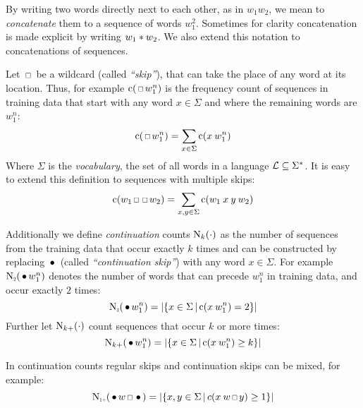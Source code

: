 By writing two words directly next to each other, as in $w_1 w_2$, we mean to
\emph{concatenate} them to a sequence of words $w_1^2$.
Sometimes for clarity concatenation is made explicit by writing
$w_1 * w_2$. We also extend this notation to concatenations of
sequences.

Let $\Skp$ be a wildcard (called \emph{``skip''}), that can take the place
of any word at its location.
Thus, for example $\Count(\Skp w_1^n)$ is the frequency count of sequences
in training data that start with any word $x \in \Sigma$ and where the remaining
words are $w_1^n$:
\begin{equation}
  \Count(\Skp w_1^n) = \sum_{x \in \Sigma} \Count(x \: w_1^n)
\end{equation}
Where $\Sigma$ is the \emph{vocabulary}, the set of all words in a language
$\mathcal{L} \subseteq \Sigma^{*}$.
It is easy to extend this definition to sequences with multiple skips:
\begin{equation}
  \Count(w_1 \Skp \Skp w_2) = \sum_{x, y \in \Sigma} \Count(w_1 \: x \: y \: w_2)
\end{equation}

Additionally we define \emph{continuation} counts $\operatorname{N}_k(\cdot)$ as
the number of sequences from the training data that occur exactly $k$ times and
can be constructed by replacing $\,\bullet\,$ (called \emph{``continuation skip''})
with any word $x \in \Sigma$.
For example $\ContCountII(\WSkp w_1^n)$ denotes the number of words that can
precede $w_1^n$ in training data, and occur exactly $2$ times:
\begin{equation}
  \ContCountII(\WSkp w_1^n) =
    \Cardinality{\left\{ x \in \Sigma \,\middle|\, \Count(x \: w_1^n) = 2 \right\}}
\end{equation}
Further let $\operatorname{N}_{k+}(\cdot)$ count sequences that occur $k$ or more
times:
\begin{equation}
  \operatorname{N}_{k+}(\,\bullet\, w_1^n) =
    \left|\left\{ x \in \Sigma \,\middle|\, \operatorname{c}(x \: w_1^n) \geq k \right\}\right|
\end{equation}

In continuation counts regular skips and continuation skips can be mixed, for
example:
\begin{equation}
  \ContCountIp(\WSkp w \Skp \WSkp) =
    \Cardinality{\left\{ x, y \in \Sigma \,\middle|\, c(x \: w \Skp y) \geq 1 \right\}}
\end{equation}

